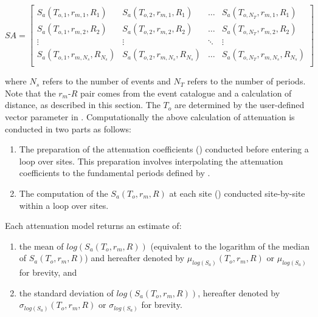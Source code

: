 \begin{math}
 SA = \left[ \begin{array}{ccccc}
S_a(T_{o,1},r_{m,1},R_1) & S_a(T_{o,2},r_{m,1},R_1) &  \hdots & S_a(T_{o,N_T},r_{m,1},R_1) \\
S_a(T_{o,1},r_{m,2},R_2) & S_a(T_{o,2},r_{m,2},R_2) &  \hdots & S_a(T_{o,N_T},r_{m,2},R_2) \\
\vdots & \vdots &  \ddots & \vdots \\
S_a(T_{o,1},r_{m,N_s},R_{N_s}) & S_a(T_{o,2},r_{m,N_s},R_{N_s}) & \hdots & S_a(T_{o,N_T},r_{m,N_s},R_{N_s}) \\
\end{array} \right]
\end{math}

where $N_s$ refers to the number of events and $N_T$ refers to the
number of periods. Note that the $r_m$-$R$ pair comes from the event
catalogue and a calculation of distance, as described in this
section. The $T_o$ are determined by the user-defined vector
parameter  in .
Computationally the above calculation of attenuation is conducted in
two parts as follows:
\begin{enumerate}
\item The preparation of the attenuation coefficients
() conducted before entering a loop over
sites. This preparation involves interpolating the attenuation
coefficients to the fundamental periods defined by
. \item The computation of the $S_a(T_o,r_m,R)$
at each site () conducted site-by-site
within a loop over sites.
\end{enumerate}


Each attenuation model returns an estimate of:
\begin{enumerate}
\item the mean of $log(S_a(T_o,r_m,R))$ (equivalent to the
logarithm of the median of $S_a(T_o,r_m,R)$) and hereafter denoted
by $\mu_{log(S_a)}(T_o,r_m,R)$ or $\mu_{log(S_a)}$ for brevity, and
\item the standard deviation of $log(S_a(T_o,r_m,R))$, hereafter
denoted by \newline $\sigma_{log(S_a)}(T_o,r_m,R)$ or
$\sigma_{log(S_a)}$ for brevity.
\end{enumerate}


